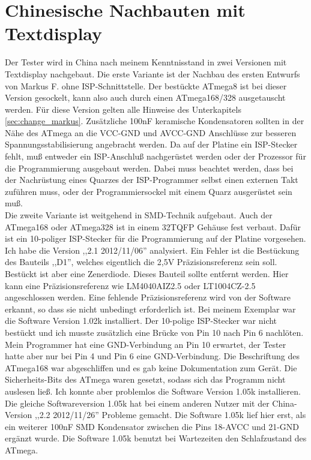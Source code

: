 \section{Chinesische Nachbauten mit Textdisplay}
Der Tester wird in China nach meinem Kenntnisstand in zwei Versionen mit Textdisplay nachgebaut.
Die erste Variante ist der Nachbau des ersten Entwurfs von Markus F. ohne ISP-Schnittstelle.
Der bestückte ATmega8 ist bei dieser Version gesockelt, kann also auch durch einen ATmega168/328 ausgetauscht werden.
Für diese Version gelten alle Hinweise des Unterkapitels \ref{sec:change_markus}.
Zusätzliche 100nF keramische Kondensatoren sollten in der Nähe des ATmega an die VCC-GND und
AVCC-GND Anschlüsse zur besseren Spannungsstabilisierung angebracht werden.
Da auf der Platine ein ISP-Stecker fehlt, muß entweder ein ISP-Anschluß nachgerüstet werden oder
der Prozessor für die Programmierung ausgebaut werden.
Dabei muss beachtet werden, dass bei der Nachrüstung eines Quarzes der ISP-Programmer selbst
einen externen Takt zuführen muss, oder der Programmiersockel mit einem Quarz ausgerüstet sein muß.\\
Die zweite Variante ist weitgehend in SMD-Technik aufgebaut. Auch der ATmega168 oder ATmega328 
ist in einem 32TQFP Gehäuse fest verbaut.
Dafür ist ein 10-poliger ISP-Stecker für die Programmierung auf der Platine vorgesehen.
Ich habe die Version ,,2.1 2012/11/06'' analysiert. Ein Fehler ist die Bestückung des Bauteils ,,D1'',
welches eigentlich die 2,5V Präzisionsreferenz sein soll. Bestückt ist aber eine Zenerdiode.
Dieses Bauteil sollte entfernt werden. Hier kann eine Präzisionsreferenz wie LM4040AIZ2.5 oder
LT1004CZ-2.5 angeschlossen werden. Eine fehlende Präzisionsreferenz wird von der Software erkannt,
so dass sie nicht unbedingt erforderlich ist.
Bei meinem Exemplar war die Software Version 1.02k installiert. Der 10-polige ISP-Stecker war nicht
bestückt und ich musste zusätzlich eine Brücke von Pin 10 nach Pin 6 nachlöten. Mein Programmer hat eine 
GND-Verbindung an Pin 10 erwartet, der Tester hatte aber nur bei Pin 4 und Pin 6 eine GND-Verbindung.
Die Beschriftung des ATmega168 war abgeschliffen und es gab keine Dokumentation zum Gerät.
Die Sicherheits-Bits des ATmega waren gesetzt, sodass sich das Programm nicht auslesen ließ.
Ich konnte aber problemlos die Software Version 1.05k installieren.
Die gleiche Softwareversion 1.05k hat bei einem anderen Nutzer mit der China-Version ,,2.2 2012/11/26'' Probleme
gemacht. Die Software 1.05k lief hier erst, als ein weiterer 100nF SMD Kondensator zwischen die Pins 18-AVCC
und 21-GND ergänzt wurde. Die Software 1.05k benutzt bei Wartezeiten den Schlafzustand des ATmega.
